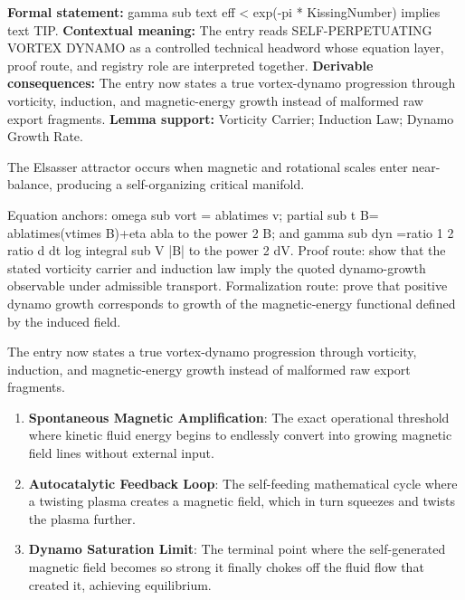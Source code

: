 \begingroup\footnotesize\setlength{\emergencystretch}{3em}\sloppy
\textbf{Formal statement:} gamma sub text eff < exp(-pi * KissingNumber) implies text TIP. \textbf{Contextual meaning:} The entry reads SELF-PERPETUATING VORTEX DYNAMO as a controlled technical headword whose equation layer, proof route, and registry role are interpreted together. \textbf{Derivable consequences:} The entry now states a true vortex-dynamo progression through vorticity, induction, and magnetic-energy growth instead of malformed raw export fragments. \textbf{Lemma support:} Vorticity Carrier; Induction Law; Dynamo Growth Rate.\par
\endgroup

The Elsasser attractor occurs when magnetic and rotational scales enter near-balance, producing a self-organizing critical manifold.

Equation anchors: omega sub vort = ablatimes v; partial sub t B= ablatimes(vtimes B)+eta abla to the power 2 B; and gamma sub dyn =ratio 1 2 ratio d dt log integral sub V |B| to the power 2 dV. Proof route: show that the stated vorticity carrier and induction law imply the quoted dynamo-growth observable under admissible transport. Formalization route: prove that positive dynamo growth corresponds to growth of the magnetic-energy functional defined by the induced field.

The entry now states a true vortex-dynamo progression through vorticity, induction, and magnetic-energy growth instead of malformed raw export fragments.
\endgroup

\begin{enumerate}[leftmargin=1.6em,itemsep=6pt,topsep=4pt]
\item \textbf{Spontaneous Magnetic Amplification}: The exact operational threshold where kinetic fluid energy begins to endlessly convert into growing magnetic field lines without external input.
\item \textbf{Autocatalytic Feedback Loop}: The self-feeding mathematical cycle where a twisting plasma creates a magnetic field, which in turn squeezes and twists the plasma further.
\item \textbf{Dynamo Saturation Limit}: The terminal point where the self-generated magnetic field becomes so strong it finally chokes off the fluid flow that created it, achieving equilibrium.
\end{enumerate}

